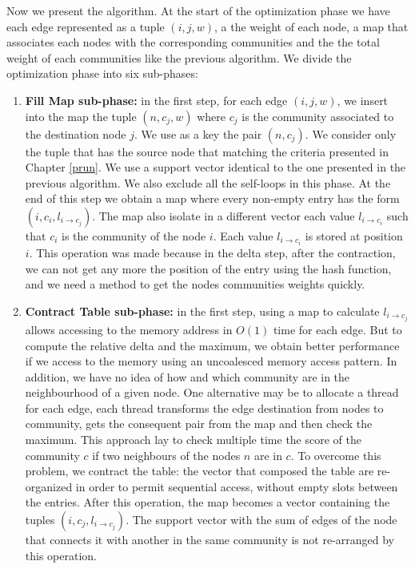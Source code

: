 Now we present the algorithm. At the start of the optimization phase we have each edge represented as a tuple $(i,j,w)$,  a the weight of each node,  a map that associates each nodes with the corresponding communities  and the the total weight of each communities like the previous algorithm. 
We divide the optimization phase into six sub-phases:
\begin{enumerate}
	\item \textbf{Fill Map sub-phase:} in the first step, for each edge $(i,j,w)$, we insert into the map the tuple $(n, c_j, w)$ where $c_j$ is the community associated to the destination node $j$. We use as a key the pair $(n,c_j)$.
	We consider only the tuple that has the source node that matching the criteria presented in \\Chapter \ref{prun}. We use a support vector identical to the one presented in the previous algorithm. We also exclude all the self-loops in this phase. At the end of this step we obtain a map where every non-empty entry has the form $(i, c_i, l_{i \rightarrow c_j})$. The map also isolate in a different vector each value $l_{i \rightarrow c_i}$ such that $c_i$ is the community of the node $i$. Each value  $l_{i \rightarrow c_i}$ is stored at position $i$. This operation was made because in the delta step, after the contraction, we can not get any more the position of the entry using the hash function, and we need a method to get the nodes communities weights quickly. 
	
	\item \textbf{Contract Table sub-phase:} in the first step, using a map to calculate $l_{i \rightarrow c_j}$ allows accessing to the memory address in $O(1)$ time for each edge. But to compute the relative delta and the maximum, we obtain better performance if we access to the memory using an uncoalesced memory access pattern. In addition, we have no idea of how and which community are in the neighbourhood of a given node. One alternative may be to allocate a thread for each edge, each thread transforms the edge destination from nodes to community, gets the consequent pair from the map and then check the maximum. This approach lay to check multiple time the score of the community $c$ if two neighbours of the nodes $n$ are in $c$. To overcome this problem, we contract the table: the vector that composed the table are re-organized in order to permit sequential access, without empty slots between the entries. After this operation, the map becomes a vector containing the tuples $(i, c_j,l_{i \rightarrow c_j})$. The support vector with the sum of edges of the node that connects it with another in the same community is not re-arranged by this operation.
	

\end{enumerate}
